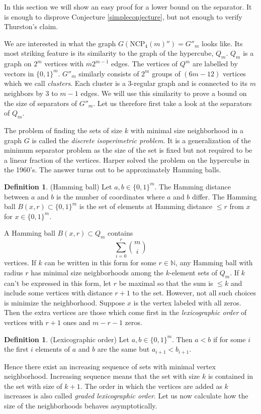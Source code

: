 \documentclass[a4paper,12pt]{book}
\theoremstyle{plain}
\theoremstyle{definition}
\newtheorem{definition}[theorem]{Definition}
\newcommand\NC{\textrm{NCP}}
\begin{document}
In this section we will show an easy proof for a lower bound on the separator. It
is enough to disprove Conjecture \ref{simpleconjecture}, but not enough to verify Thurston's
claim.

We are interested in what the graph $G(\NC_4(m)'') = G''_m$ looks like. Its 
most striking feature is its similarity to the graph of the hypercube, $Q_m$. 
$Q_m$ is a graph on $2^m$ vertices with $m2^{m-1}$ edges. The vertices of $Q^m$
are labelled by vectors in $\{0,1\}^m$. $G''_m$ 
similarly consists of $2^m$ groups of $(6m-12)$ vertices which we call 
\textit{clusters}. Each cluster is a 3-regular graph and is connected to its
$m$ neighbors by 3 to $m-1$ edges. We will use this similarity to 
prove a bound on the size of separators of $G''_m$. Let us therefore first take a 
look at the separators of $Q_m$.

The problem of finding the sets of size $k$ with minimal size neighborhood in a graph $G$ is 
called the \textit{discrete isoperimetric problem}. It is a generalization of 
the minimum separator problem as the size of the set is fixed but not required to be a linear fraction
of the vertices. 
Harper \cite{Harp} solved the problem on the hypercube in the 1960's. The 
answer turns out to be approximately Hamming balls.

\begin{definition}
 (Hamming ball) Let $a,b \in \{0,1\}^m$. The Hamming distance between $a$ and 
$b$ is the number of coordinates where $a$ and $b$ differ. The Hamming ball 
$B(x,r) \subset \{0,1\}^m$ is the set of elements at Hamming distance $\leq r$ from $x$ for $x \in \{0,1\}^m$.
\end{definition}

A Hamming ball $B(x,r) \subset Q_m$ contains
\begin{equation}
 \sum_{i=0}^r {m \choose i}
\end{equation}
vertices. If $k$ can be written in this form for some $r \in \mathbb{N}$, any Hamming ball with radius $r$ has minimal size neighborhoods 
among the $k$-element sets of $Q_m$. 
If $k$ can't be expressed in this form, let $r$ be maximal so that 
the sum is $\leq k$ and include some vertices with distance $r+1$ to the set. 
However, not all such choices is minimize the neighborhood. Suppose $x$ is the vertex labeled with 
all zeros. Then the extra vertices are those which come first in the
\textit{lexicographic order} of vertices with $r+1$ ones and $m-r-1$ zeros.
\begin{definition}
 (Lexicographic order) Let $a,b \in \{0,1\}^m$. Then $a<b$ if for some $i$ the first $i$ 
elements of $a$ and $b$ are the same but $a_{i+1} < b_{i+1}$.
\end{definition}
Hence there exist an increasing sequence of sets with minimal vertex neighborhood. Increasing sequence means that
the set with size $k$ is contained in the set with size of $k+1$. The order in which the 
vertices are added as $k$ increases is also called \textit{graded lexicographic 
order}. Let us now calculate how the size of the neighborhoods behaves asymptotically.
\end{document}

